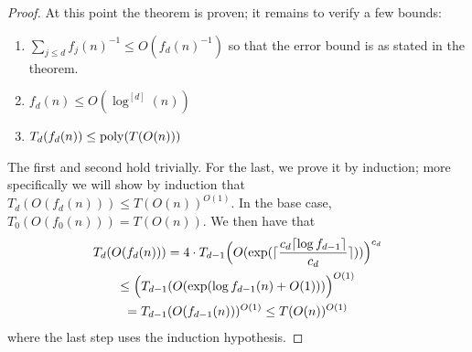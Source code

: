 \begin{proof}
At this point the theorem is proven; it remains to verify a few bounds:
\begin{enumerate}
    \item $\sum_{j \leq d} f_j(n)^{-1} \leq O(f_d(n)^{-1})$ so that the error bound is as stated in the theorem.
    \item $f_d(n) \leq O(\log^{[d]}(n))$
    \item $T_d(f_d(n)) \leq \mathrm{poly}(T(O(n)))$
\end{enumerate}
The first and second hold trivially. For the last, we prove it by induction; more specifically we will show by induction that $T_d(O(f_d(n))) \leq T(O(n))^{O(1)}$. In the base case, $T_0(O(f_0(n))) = T(O(n))$. We then have that
\begin{gather}
T_d(O(f_d(n))) = 4 \cdot T_{d-1}\Bigl(O(\exp(\lceil \frac{c_d \lceil \log f_{d-1} \rceil }{c_d} \rceil ))\Bigr)^{c_d} \\\leq  \Bigl(T_{d-1}(O(\exp( \log f_{d-1}(n) + O(1)))\Bigr)^{O(1)} \\= T_{d-1}(O(f_{d-1}(n)))^{O(1)} \leq T(O(n))^{O(1)}
\end{gather}
where the last step uses the induction hypothesis.
\end{proof}




